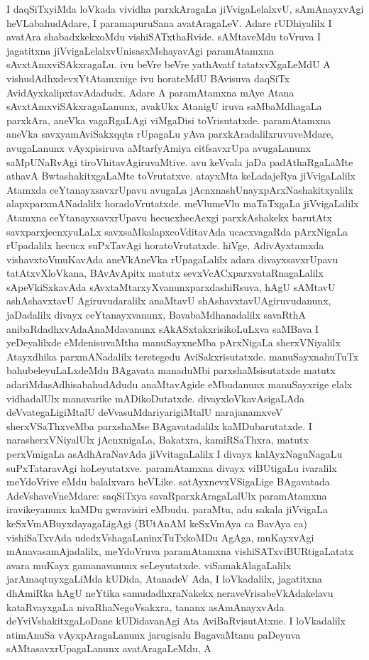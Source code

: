 I daqSiTxyiMda loVkada vividha parxkAragaLa jiVvigaLelalxvU, sAmAnayxvAgi heVLa\-bahudAdare, I paramapuruSana avatAragaLeV. Adare rUDhiyalilx I avatAra shabadxkekx\break oMdu vishiSATxthaRvide. sAMtaveMdu toVruva I jagatitxna jiVvigaLelalxvU\break nisasxMshayavAgi paramAtamxna sAvxtAmxviSAkxragaLu. ivu beVre beVre yathAvatf tatatxvX\-gaLeMdU A vishudAdhxdevxYtAtamxnige ivu horateMdU BAvisuva daqSiTx AvidAyxkalipxta\-vAdadudx. Adare A paramAtamxna mAye Atana sAvxtAmxviSAkxragaLanunx, avakUkx Ata\-nigU iruva saMbaMdhagaLa parxkAra, aneVka vagaRgaLAgi viMgaDisi toVrisutatxde. para\-mAtamxna aneVka savxyamAviSakxqqta rUpagaLu yAva parxkAradalilxruvuveMdare, avu\-gaLanunx vAyxpisiruva aMtarfyAmiya citfsavxrUpa avugaLanunx saMpUNaRvAgi tiroVhita\-vAgiruvaMtive. avu keVvala jaDa padAthaRgaLaMte athavA BwtashakitxgaLaMte toVru\-tatxve. atayxMta keLadajeRya jiVvigaLalilx Atamxda ceYtanayxsavxrUpavu avugaLa jAcnxnashUnayx\break pArxNashakitxyalilx alapxparxmANadalilx horadoVrutatxde. meVlumeVlu maTaTxgaLa jiVvi\-gaLalilx Atamxna ceYtanayxsavxrUpavu hecucxhecAcxgi parxkAshakekx barutAtx savxparxjecnxyuLaLx savxsaMkalapx\-coVdita\-vAda ucacxvagaRda pArxNigaLa rUpadalilx hecucx suPxTavAgi horatoVrutatxde. hiVge, A\break divAyxtamxda vishavxtoVmuKavAda aneVkAneVka rUpagaLalilx adara divayxsavxrUpavu tatAtxvX\-loVkana, BAvAvApitx matutx sevxVcACxparxvataRnagaLalilx sApeVkiSxkavAda sAvxtaMtarxyXvanunx\break parxdashiRsuva, hAgU sAMtavU ashAshavxtavU Agiruvudaralilx anaMtavU shAshavxtavU\break Agiruvudanunx, jaDadalilx divayx ceYtanayxvanunx, BavabaMdhanadalilx savaRthA anibaRdadhxvAda\break AnaMdavanunx sAkASxtakxrisikoLuLxva saMBava I yeDeyalilxde eMdenisuvaMtha manuSayx\-neMba pArxNigaLa sherxVNiyalilx Atayxdhika parxmANadalilx teretegedu AviSakxrisutatxde. manuSayxna\break huTuTx bahubeleyuLaLxdeMdu BAgavata manaduMbi parxshaMsisutatxde matutx adariMda\break sAdhisabahudAdudu anaMtavAgide eMbudanunx manuSayxrige elalx vidhadalUlx mana\-varike mADikoDutatxde. divayxloVkavAsigaLAda deVvategaLigiMtalU deVvasuMdari\-yari\-giMtalU narajanamxveV sherxVSaThxveMba parxshaMse BAgavatadalilx kaMDubarutatxde. I nara\-sherxVNi\-yalUlx jAcnxnigaLa, Bakatxra, kamiRSaThxra, matutx perxVmigaLa asAdhAraNavAda jiVvitagaLalilx I divayx kalAyxNaguNagaLu suPxTataravAgi hoLeyutatxve. paramAtamxna divayx viBUti\-gaLu ivaralilx meYdoVrive eMdu balalxvara heVLike. satAyxnevxVSigaLige BAgavatada AdeVsha\-veVneMdare: saqSiTxya savaRparxkAragaLalUlx paramAtamxna iravikeyanunx kaMDu gwravisiri eMbudu. paraMtu, adu sakala jiVvigaLa keSxVmABuyxdayagaLigAgi (BUtAnAM keSxVmAya ca BavAya ca) vishiSaTxvAda udedxVshagaLaninxTuTxkoMDu AgAga, muKayx\-vAgi mAnavasamAjadalilx, meYdoVruva paramAtamxna vishiSATxviBURtigaLatatx avara muKayx gamanavanunx seLeyutatxde. viSamakAlagaLalilx jarAmaqtuyxgaLiMda kUDida, AtanadeV Ada, I loVkadalilx, jagatitxna dhAmiRka hAgU neYtika samudadhxraNakekx neraveVrisabeVkAda\break kelavu kataRvayxgaLa nivaRhaNegoVsakxra, tananx asAmAnayxvAda deYviVshakitxgaLoDane kUDi\-davanAgi Ata AviBaRvisutAtxne. I loVkadalilx atimAnuSa vAyxpAragaLanunx jarugi\-salu BagavaMtanu paDeyuva sAMtasavxrUpagaLanunx avatAragaLeMdu, A 